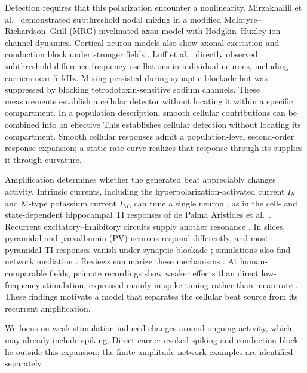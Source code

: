 \documentclass[11pt,a4paper]{article}
\providecommand{\DIFaddtex}[1]{{\protect\color{blue} \sf #1}} %
\providecommand{\DIFdeltex}[1]{{\protect\color{red} \scriptsize #1}} %
\providecommand{\DIFaddbegin}{} %
\providecommand{\DIFaddend}{} %
\providecommand{\DIFdelbegin}{} %
\providecommand{\DIFdelend}{} %
\providecommand{\DIFadd}[1]{\texorpdfstring{\DIFaddtex{#1}}{#1}} %
\providecommand{\DIFdel}[1]{\texorpdfstring{\DIFdeltex{#1}}{}} %
\begin{document}
Detection requires that this polarization encounter a nonlinearity. Mirzakhalili
et al.\ \cite{mirzakhalili2020} demonstrated subthreshold nodal mixing in a modified
McIntyre--\allowbreak Richardson--\allowbreak Grill (MRG) myelinated-axon model
with Hodgkin--Huxley ion-channel dynamics. Cortical-neuron models also
show axonal excitation and conduction block under stronger fields \cite{wang2023}.
Luff et al.\ \cite{luff2024mixer} directly observed subthreshold difference-frequency
oscillations in individual neurons, including carriers near $5$~kHz. Mixing persisted
during synaptic blockade but was suppressed by blocking tetrodotoxin-sensitive sodium
channels. \DIFdelbegin \DIFdel{These measurements establish a cellular detector without locating it
within a specific compartment. In a population description, smooth cellular contributions can be combined into an effective }\DIFdelend \DIFaddbegin \DIFadd{This establishes cellular detection without locating its compartment. Smooth
cellular responses admit a population-level }\DIFaddend second-order \DIFdelbegin \DIFdel{response}\DIFdelend \DIFaddbegin \DIFadd{expansion}\DIFaddend ; a static
rate curve \DIFdelbegin \DIFdel{realizes that response through its }\DIFdelend \DIFaddbegin \DIFadd{supplies it through }\DIFaddend curvature.

Amplification determines whether the generated beat appreciably changes activity.
Intrinsic currents, including the hyperpolarization-activated current $I_h$ and
M-type potassium current $I_M$, can tune a single neuron \cite{hutcheonyarom2000},
as in the cell- and state-dependent hippocampal TI responses of de Palma Aristides
et al.\ \cite{depalma2026ti}. Recurrent excitatory--inhibitory circuits supply another
resonance \cite{brunelhakim1999,brunelwang2003,ledoux2011}. In slices, pyramidal and
parvalbumin (PV) neurons respond differently, and most pyramidal TI responses
vanish under synaptic blockade \cite{caldas2024}; simulations also find network
mediation \cite{karimi2024,esmaeilpour2021}. Reviews summarize these mechanisms
\cite{soroushi2025,wangw2026}. At human-comparable fields, primate recordings show
weaker effects than direct low-frequency stimulation, expressed mainly in spike
timing rather than mean rate \cite{vieira2024}.
\DIFdelbegin \DIFdel{These findings motivate a model
that separates the cellular beat source from its recurrent amplification.
}\DIFdelend

We focus on weak stimulation-induced changes around ongoing activity, which may
already include spiking. Direct carrier-evoked spiking and conduction block
\cite{opancar2025,peripheral2023,semenov2025} lie outside this expansion; the
finite-amplitude network examples are identified separately.
\end{document}
